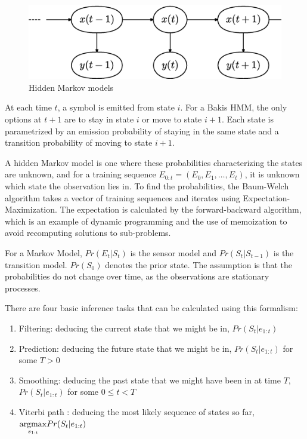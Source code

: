 \documentclass[12pt,a4,notitlepage]{report}
\renewcommand{\_}{\texttt{\symbol{95}}}
\newcommand{\<}{\texttt{\symbol{60}}}
\renewcommand{\>}{\texttt{\symbol{62}}}
\begin{document}
\begin{figure}
\centering
\includegraphics[scale=0.6,angle=0]{diagrams/markov.ps}
\caption{Hidden Markov models}
\label{hmm}
\end{figure}

At each time $t$, a symbol is emitted from state $i$. For a Bakis HMM, the only options at $t+1$ are to stay in state $i$ or move to state $i+1$\cite{Bakis}. Each state is parametrized by an emission probability of staying in the same state and a transition probability of moving to state $i+1$.

A hidden Markov model is one where these probabilities characterizing the states are unknown, and for a training sequence $E_{0:t} = (E_0, E_1, \ldots, E_t)$, it is unknown which state the observation lies in. To find the probabilities, the Baum-Welch algorithm takes a vector of training sequences and iterates using Expectation-Maximization. The expectation is calculated by the forward-backward algorithm, which is an example of dynamic programming and the use of memoization to avoid recomputing solutions to sub-problems.

For a Markov Model, $Pr(E_t|S_t)$ is the sensor model and $Pr(S_t|S_{t-1})$ is the transition model. $Pr(S_0)$ denotes the prior state. The assumption is that the probabilities do not change over time, as the observations are stationary processes.

There are four basic inference tasks that can be calculated using this formalism\cite{AIModern}:

\begin{enumerate}
\item Filtering: deducing the current state that we might be in, $Pr(S_t|e_{1:t})$
\item Prediction: deducing the future state that we might be in, $Pr(S_t|e_{1:t})$ for some $T>0$
\item Smoothing: deducing the past state that we might have been in at time $T$, $Pr(S_t|e_{1:t})$ for some $0 \le t < T$
\item Viterbi path : deducing the most likely sequence of states so far, $\underset{s_{1:t}}{\operatornamewithlimits{argmax}}Pr(S_t|e_{1:t})$
\end{enumerate}
\end{document}
